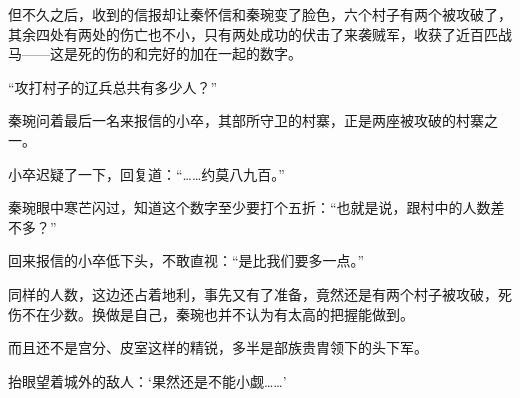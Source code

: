 但不久之后，收到的信报却让秦怀信和秦琬变了脸色，六个村子有两个被攻破了，其余四处有两处的伤亡也不小，只有两处成功的伏击了来袭贼军，收获了近百匹战马——这是死的伤的和完好的加在一起的数字。

“攻打村子的辽兵总共有多少人？”

秦琬问着最后一名来报信的小卒，其部所守卫的村寨，正是两座被攻破的村寨之一。

小卒迟疑了一下，回复道：“……约莫八九百。”

秦琬眼中寒芒闪过，知道这个数字至少要打个五折：“也就是说，跟村中的人数差不多？”

回来报信的小卒低下头，不敢直视：“是比我们要多一点。”

同样的人数，这边还占着地利，事先又有了准备，竟然还是有两个村子被攻破，死伤不在少数。换做是自己，秦琬也并不认为有太高的把握能做到。

而且还不是宫分、皮室这样的精锐，多半是部族贵胄领下的头下军。

抬眼望着城外的敌人：‘果然还是不能小觑……’

